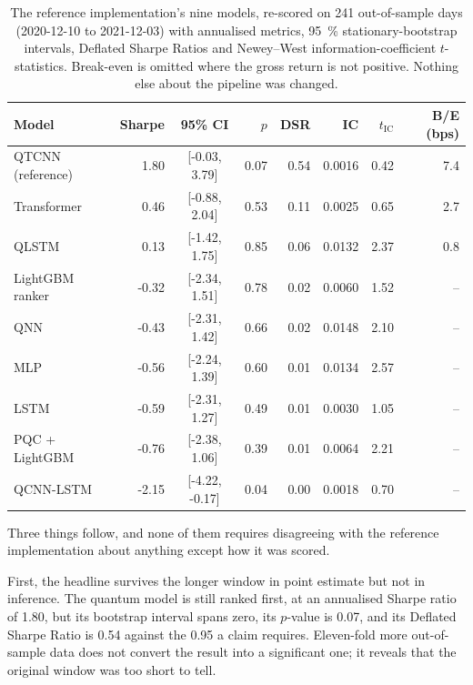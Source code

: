 \begin{table}[t]
  \centering
  \caption{The reference implementation's nine models, re-scored on
  \num{241} out-of-sample days (2020-12-10 to 2021-12-03) with annualised
  metrics, \SI{95}{\percent} stationary-bootstrap intervals, Deflated Sharpe
  Ratios and Newey--West information-coefficient $t$-statistics. Break-even is
  omitted where the gross return is not positive. Nothing else about the
  pipeline was changed.}
  \label{tab:reeval}
  \small
  \begin{tabular}{lrcrrrrr}
    \toprule
    Model & Sharpe & 95\% CI & $p$ & DSR & IC & $t_{\mathrm{IC}}$ & B/E (bps) \\
    \midrule
    QTCNN (reference)  &  1.80 & [-0.03,  3.79] & 0.07 & 0.54 & 0.0016 &  0.42 & 7.4 \\
    Transformer        &  0.46 & [-0.88,  2.04] & 0.53 & 0.11 & 0.0025 &  0.65 & 2.7 \\
    QLSTM              &  0.13 & [-1.42,  1.75] & 0.85 & 0.06 & 0.0132 &  2.37 & 0.8 \\
    LightGBM ranker    & -0.32 & [-2.34,  1.51] & 0.78 & 0.02 & 0.0060 &  1.52 & --  \\
    QNN                & -0.43 & [-2.31,  1.42] & 0.66 & 0.02 & 0.0148 &  2.10 & --  \\
    MLP                & -0.56 & [-2.24,  1.39] & 0.60 & 0.01 & 0.0134 &  2.57 & --  \\
    LSTM               & -0.59 & [-2.31,  1.27] & 0.49 & 0.01 & 0.0030 &  1.05 & --  \\
    PQC + LightGBM     & -0.76 & [-2.38,  1.06] & 0.39 & 0.01 & 0.0064 &  2.21 & --  \\
    QCNN-LSTM          & -2.15 & [-4.22, -0.17] & 0.04 & 0.00 & 0.0018 &  0.70 & --  \\
    \bottomrule
  \end{tabular}
\end{table}

Three things follow, and none of them requires disagreeing with the reference
implementation about anything except how it was scored.

First, the headline survives the longer window in point estimate but not in
inference. The quantum model is still ranked first, at an annualised Sharpe
ratio of \num{1.80}, but its bootstrap interval spans zero, its $p$-value is
\num{0.07}, and its Deflated Sharpe Ratio is \num{0.54} against the \num{0.95}
a claim requires. Eleven-fold more out-of-sample data does not convert the
result into a significant one; it reveals that the original window was too
short to tell.

